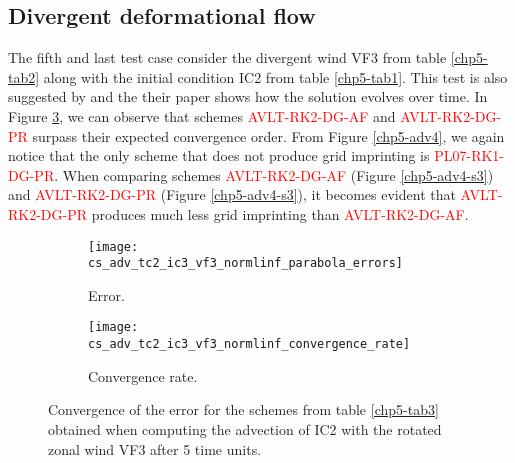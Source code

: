 \subsection{Divergent deformational flow}
The fifth and last test case consider the divergent wind VF3 from table \ref{chp5-tab2} along with
the initial condition IC2 from table \ref{chp5-tab1}.
This test is also suggested by \citet{nair:2010} and the their paper shows how the solution evolves over time.
In Figure \ref{chp5-error-adv4}, we can observe that schemes \textcolor{red}{AVLT-RK2-DG-AF} and \textcolor{red}{AVLT-RK2-DG-PR} surpass their expected convergence order.
From Figure \ref{chp5-adv4}, we again notice that the only scheme that does not produce grid imprinting is \textcolor{red}{PL07-RK1-DG-PR}.
When comparing schemes \textcolor{red}{AVLT-RK2-DG-AF} (Figure \ref{chp5-adv4-s3}) and \textcolor{red}{AVLT-RK2-DG-PR} (Figure \ref{chp5-adv4-s3}),
it becomes evident that \textcolor{red}{AVLT-RK2-DG-PR} produces much less grid imprinting than \textcolor{red}{AVLT-RK2-DG-AF}.
\begin{figure}[!htb]
	\centering
	\begin{subfigure}{0.42\textwidth}
		\centering
		\texttt{[image: cs\_adv\_tc2\_ic3\_vf3\_normlinf\_parabola\_errors]}
		\caption{Error.\label{chp5-adv4-error}}
	\end{subfigure}
	\begin{subfigure}{0.42\textwidth}
		\centering
		\texttt{[image: cs\_adv\_tc2\_ic3\_vf3\_normlinf\_convergence\_rate]}
		\caption{Convergence rate.\label{chp5-adv4-cr}}
	\end{subfigure}
	\caption{Convergence of the error for the schemes from table \ref{chp5-tab3} obtained when computing the advection of IC2  with the rotated zonal wind VF3 after 5 time units.
		\label{chp5-error-adv4}}
\end{figure}


